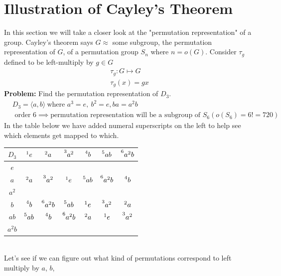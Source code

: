 \section*{Illustration of Cayley's Theorem}
In this section we will take a closer look at the "permutation representation" of a group. Cayley's
theorem says $G\approx$ some subgroup, the permutation representation of $G$, of a permutation group
$S_n$ where $n=o(G)$. Consider $\tau_g$ defined to be left-multiply by $g\in G$
\begin{align}
    \tau_g : G\mapsto G \nonumber \\
    \tau_g(x) = gx \nonumber
\end{align}
\textbf{Problem:} Find the permutation representation of $D_3$.
\begin{align}
    &D_3 = \langle a,b \rangle \ \text{where } a^3=e, \ b^2 = e, ba=a^2b \nonumber \\
    &\text{ order }6 \implies \text{permutation representation will be a subgroup of }S_6 (o(S_6)=6!=720) \nonumber
\end{align}
In the table below we have added numeral superscripts on the left to help see which elements get
mapped to which.
\begin{table}[h!]
    \centering
    \begin{tabular}{c|c|c|c|c|c|c|}
          $D_3$& $\prescript{1}{}{e}$&$\prescript{2}{}{a}$&$\prescript{3}{}{a^2}$&$\prescript{4}{}{b}$&$\prescript{5}{}{ab}$&$\prescript{6}{}{a^2b}$ \\ \hline
          $e$&&&&&& \\ \hline
          $a$&$\prescript{2}{}{a}$&$\prescript{3}{}{a^2}$&$\prescript{1}{}{e}$&$\prescript{5}{}{ab}$&$\prescript{6}{}{a^2b}$&$\prescript{4}{}{b}$ \\ \hline
          $a^2$&&&&&& \\ \hline
          $b$&$\prescript{4}{}{b}$&$\prescript{6}{}{a^2b}$&$\prescript{5}{}{ab}$&$\prescript{1}{}{e}$&$\prescript{3}{}{a^2}$&$\prescript{2}{}{a}$ \\ \hline
          $ab$&$\prescript{5}{}{ab}$&$\prescript{4}{}{b}$&$\prescript{6}{}{a^2b}$&$\prescript{2}{}{a}$&$\prescript{1}{}{e}$&$\prescript{3}{}{a^2}$ \\ \hline
          $a^2b$&&&&&& \\ \hline
    \end{tabular}
    \label{tab:D_3_Partial_Cayley_Table}
\end{table}\\
Let's see if we can figure out what kind of permutations correspond to left multiply by $a$, $b$,
